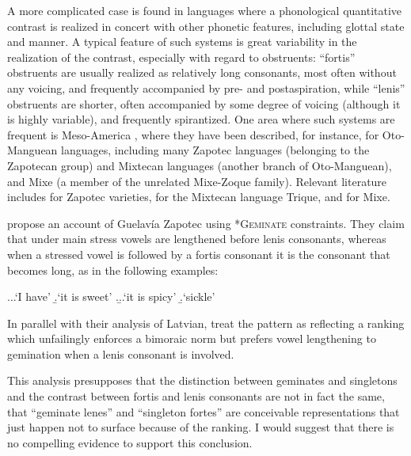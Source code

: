 A more complicated case is found in languages where a phonological quantitative contrast is realized in concert with other phonetic features, including glottal state and manner. A typical feature of such systems is great variability in the realization of the contrast, especially with regard to obstruents: \enquote{fortis} obstruents are usually realized as relatively long consonants, most often without any voicing, and frequently accompanied by pre- and postaspiration, while \enquote{lenis} obstruents are shorter, often accompanied by some degree of voicing (although it is highly variable), and frequently spirantized. One area where such systems are frequent is Meso-America \citep[\cfm][]{campbell86:_meso_americ_linguis_area}, where they have been described, for instance, for Oto-Manguean languages, including many Zapotec languages (belonging to the Zapotecan group) and Mixtecan languages (another branch of Oto-Manguean), and Mixe (a member of the unrelated Mixe-Zoque family). Relevant literature includes \citet{jones77:_guelav_zapot,nellis80:_fortis_cajon_zapot,jaeger83,avelino01:_yalál_zapot,leander08:_acous_san_frans_ozolot_zapot} for Zapotec varieties, \citet{dicanio10:_ituny_trique} for the Mixtecan language Trique, and \citet{bickford85:_fortis_guich_mixe} for Mixe.

\citet{bye08} propose an account of Guelavía Zapotec \citep[citing][]{jones77:_guelav_zapot,gonzalez03} using *\textsc{Geminate} constraints. They claim that under main stress vowels are lengthened before lenis consonants, whereas when a stressed vowel is followed by a fortis consonant it is the consonant that becomes long, as in the following examples:

\ex.\a.\a.`I have'
\b.`it is sweet'
\z.\b.\a.`it is spicy'
\b.`sickle'

In parallel with their analysis of Latvian, \citet{bye08} treat the pattern as reflecting a ranking  which unfailingly enforces a bimoraic norm but prefers vowel lengthening to gemination when a lenis consonant is involved.

This analysis presupposes that the distinction between geminates and singletons and the contrast between fortis and lenis consonants are not in fact the same, \ie that \enquote{geminate lenes} and \enquote{singleton fortes} are conceivable representations that just happen not to surface because of the ranking. I would suggest that there is no compelling evidence to support this conclusion.

